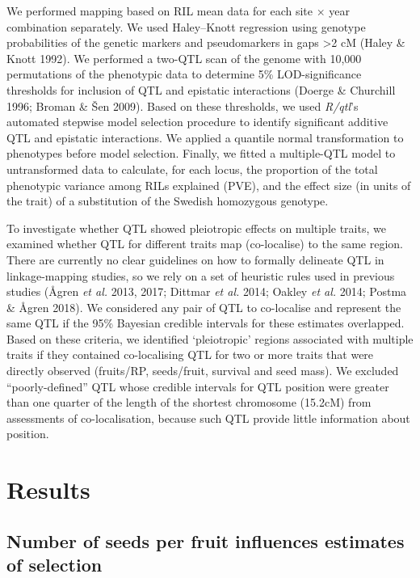 \documentclass[]{article}
\begin{document}
We performed mapping based on RIL mean data for each site × year combination separately. We used Haley--Knott regression using genotype probabilities of the genetic markers and pseudomarkers in gaps \textgreater{}2 cM (Haley \& Knott 1992). We performed a two-QTL scan of the genome with 10,000 permutations of the phenotypic data to determine 5\% LOD-significance thresholds for inclusion of QTL and epistatic interactions (Doerge \& Churchill 1996; Broman \& Šen 2009). Based on these thresholds, we used \emph{R/qtl}'s automated stepwise model selection procedure to identify significant additive QTL and epistatic interactions. We applied a quantile normal transformation to phenotypes before model selection. Finally, we fitted a multiple-QTL model to untransformed data to calculate, for each locus, the proportion of the total phenotypic variance among RILs explained (PVE), and the effect size (in units of the trait) of a substitution of the Swedish homozygous genotype.

To investigate whether QTL showed pleiotropic effects on multiple traits, we examined whether QTL for different traits map (co-localise) to the same region. There are currently no clear guidelines on how to formally delineate QTL in linkage-mapping studies, so we rely on a set of heuristic rules used in previous studies (Ågren \emph{et al.} 2013, 2017; Dittmar \emph{et al.} 2014; Oakley \emph{et al.} 2014; Postma \& Ågren 2018). We considered any pair of QTL to co-localise and represent the same QTL if the 95\% Bayesian credible intervals for these estimates overlapped. Based on these criteria, we identified `pleiotropic' regions associated with multiple traits if they contained co-localising QTL for two or more traits that were directly observed (fruits/RP, seeds/fruit, survival and seed mass). We excluded ``poorly-defined'' QTL whose credible intervals for QTL position were greater than one quarter of the length of the shortest chromosome (15.2cM) from assessments of co-localisation, because such QTL provide little information about position.

\hypertarget{results}{%
\section{Results}\label{results}}

\hypertarget{number-of-seeds-per-fruit-influences-estimates-of-selection}{%
\subsection{Number of seeds per fruit influences estimates of selection}\label{number-of-seeds-per-fruit-influences-estimates-of-selection}}
\end{document}
